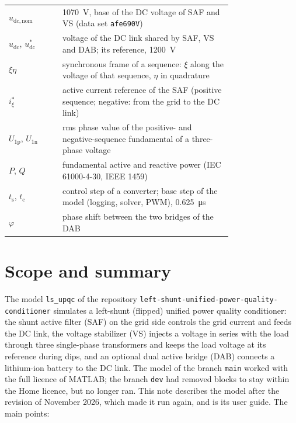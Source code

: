 \documentclass[11pt,a4paper]{scrartcl}
\newcommand{\ped}[1]{_{\mathrm{#1}}}
\newcommand{\code}[1]{\texttt{#1}}
\begin{document}
\begin{onehalfspace}
\begin{longtable}{@{} l p{0.76\linewidth} @{}}
	$u\ped{dc,nom}$ & \SI{1070}{V}, base of the DC voltage of SAF and VS (data set \code{afe690V}) \\
	$u\ped{dc}$, $u\ped{dc}^*$ & voltage of the DC link shared by SAF, VS and DAB; its reference, \SI{1200}{V} \\
	$\xi\eta$ & synchronous frame of a sequence: $\xi$ along the voltage of that sequence, $\eta$ in quadrature \\
	$i_\xi^*$ & active current reference of the SAF (positive sequence; negative: from the grid to the DC link) \\
	$U\ped{1p}$, $U\ped{1n}$ & rms phase value of the positive- and negative-sequence fundamental of a three-phase voltage \\
	$P$, $Q$ & fundamental active and reactive power (IEC 61000-4-30, IEEE 1459) \\
	$t\ped{s}$, $t\ped{c}$ & control step of a converter; base step of the model (logging, solver, PWM), \SI{0.625}{\micro\second} \\
	$\varphi$ & phase shift between the two bridges of the DAB \\
\end{longtable}
\endgroup
\addtocounter{table}{-1}

\section{Scope and summary}
\label{sec:scope}

The model \code{ls\_upqc} of the repository \code{left-shunt-unified-power-quality-conditioner} simulates a left-shunt (flipped) unified power quality conditioner: the shunt active filter (SAF) on the grid side controls the grid current and feeds the DC link, the voltage stabilizer (VS) injects a voltage in series with the load through three single-phase transformers and keeps the load voltage at its reference during dips, and an optional dual active bridge (DAB) connects a lithium-ion battery to the DC link. The model of the branch \code{main} worked with the full licence of MATLAB; the branch \code{dev} had removed blocks to stay within the Home licence, but no longer ran. This note describes the model after the revision of November 2026, which made it run again, and is its user guide. The main points:


\end{onehalfspace}
\end{document}

